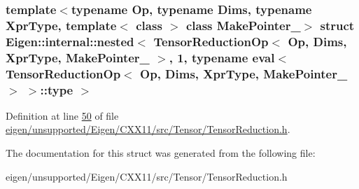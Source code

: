 \subsubsection*{template$<$typename Op, typename Dims, typename Xpr\+Type, template$<$ class $>$ class Make\+Pointer\+\_\+$>$\newline
struct Eigen\+::internal\+::nested$<$ Tensor\+Reduction\+Op$<$ Op, Dims, Xpr\+Type, Make\+Pointer\+\_\+ $>$, 1, typename eval$<$ Tensor\+Reduction\+Op$<$ Op, Dims, Xpr\+Type, Make\+Pointer\+\_\+ $>$ $>$\+::type $>$}



Definition at line \hyperlink{eigen_2unsupported_2_eigen_2_c_x_x11_2src_2_tensor_2_tensor_reduction_8h_source_l00050}{50} of file \hyperlink{eigen_2unsupported_2_eigen_2_c_x_x11_2src_2_tensor_2_tensor_reduction_8h_source}{eigen/unsupported/\+Eigen/\+C\+X\+X11/src/\+Tensor/\+Tensor\+Reduction.\+h}.



The documentation for this struct was generated from the following file\+:\begin{DoxyCompactItemize}
\item 
eigen/unsupported/\+Eigen/\+C\+X\+X11/src/\+Tensor/\+Tensor\+Reduction.\+h\end{DoxyCompactItemize}
